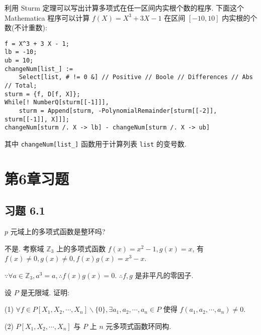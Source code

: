 \documentclass[UTF8]{ctexart}
\begin{document}
利用 Sturm 定理可以写出计算多项式在任一区间内实根个数的程序. 下面这个 Mathematica 程序可以计算 $f(X)=X^3+3X-1$ 在区间 $[-10,10]$ 内实根的个数(不计重数):
\begin{verbatim}
f = X^3 + 3 X - 1;
lb = -10;
ub = 10;
changeNum[list_] := 
    Select[list, # != 0 &] // Positive // Boole // Differences // Abs // Total;
sturm = {f, D[f, X]};
While[! NumberQ[sturm[[-1]]], 
    sturm = Append[sturm, -PolynomialRemainder[sturm[[-2]], sturm[[-1]], X]]];
changeNum[sturm /. X -> lb] - changeNum[sturm /. X -> ub]
\end{verbatim}
其中 \verb|changeNum[list_]| 函数用于计算列表 \verb|list| 的变号数.
\section{第6章习题}
\subsection{习题 6.1}
\begin{exercise}%
    $p$ 元域上的多项式函数是整环吗?
\end{exercise}
\begin{solution}
    不是. 考察域 $\mathbb{Z}_3$ 上的多项式函数 $f(x)=x^2-1,g(x)=x$, 有 $f(x)\neq0,g(x)\neq0,f(x)g(x)=x^3-x$.

    $\because\forall a\in\mathbb{Z}_3,a^3=a,\therefore f(x)g(x)=0$. $\therefore f,g$ 是非平凡的零因子.
\end{solution}
\begin{exercise}%
    设 $P$ 是无限域. 证明:
    
    (1) $\forall f\in P[X_1,X_2,\cdots,X_n]\backslash\{0\},\exists a_1,a_2,\cdots,a_n\in P$ 使得 $f(a_1,a_2,\cdots,a_n)\neq0$.

    (2) $P[X_1,X_2,\cdots,X_n]$ 与 $P$ 上 $n$ 元多项式函数环同构.
\end{exercise}
\end{document}
